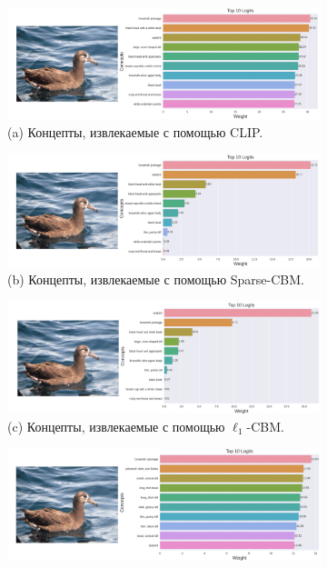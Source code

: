 \begin{figure}[h] %
\centering
   \begin{subfigure}%
     \centering
    \includegraphics[width=0.75\linewidth]{./figures/clip_im_6-compressed.png}
    \\
    (a) Концепты, извлекаемые с помощью CLIP.
    \end{subfigure}
    \begin{subfigure}%
    \centering
      \includegraphics[width=0.75\linewidth]{./figures/sparse_im_6-compressed.png}
    \\
    (b) Концепты, извлекаемые с помощью Sparse-CBM.
    \end{subfigure}
    \begin{subfigure}%
     \centering
  \includegraphics[width=0.75\linewidth]{./figures/l1_im_6-compressed.png}
    \\
    (c) Концепты, извлекаемые с помощью $\ell_1$-CBM.
    \end{subfigure}
        \begin{subfigure}%
     \centering
  \includegraphics[width=0.75\linewidth]{./figures/contr_im_6-compressed.png}

\end{subfigure}
\end{figure}
